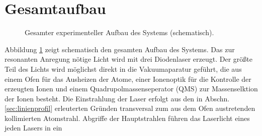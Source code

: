 \section{Gesamtaufbau}\label{sec:gesamtaufbau}
\begin{figure}[h]
 	\centering
	\caption[Gesamter experimenteller Aufbau, schematisch]{Gesamter experimenteller
	Aufbau des Systems (schematisch).}\label{fig:experimenteller_aufbau_gesamt}
\end{figure}
Abbildung \ref{fig:experimenteller_aufbau_gesamt} zeigt schematisch den gesamten
Aufbau des Systems. Das zur resonanten Anregung nötige Licht wird mit drei
Diodenlaser erzeugt. Der größte Teil des Lichts wird möglichst
direkt in die Vakuumaparatur geführt, die aus einem Ofen für das Ausheizen der
Atome, einer Ionenoptik für die Kontrolle der erzeugten Ionen und einem
Quadrupolmassenseperator (QMS) zur Massenselktion der Ionen besteht.
Die Einstrahlung der Laser erfolgt aus den in Abschn. \ref{sec:linienprofil}
erleuterten Gründen transversal zum aus dem Ofen austretenden kollimierten Atomstrahl.
Abgriffe der Hauptstrahlen führen das Laserlicht eines jeden Lasers in ein
